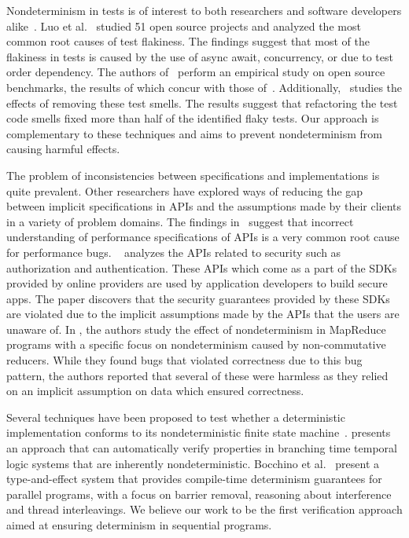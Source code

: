 Nondeterminism in tests is of interest to both
researchers and software developers alike~\cite{Fowler,Sudarshan}.
Luo et al.~\cite{LuoHEM2014} studied 51 open source projects and analyzed the most common root causes of
test flakiness. The findings suggest that most of the flakiness in tests is caused by
the use of async await, concurrency, or due to test order dependency. The authors of~\cite{PlotkinA1993}
perform an empirical study on open source benchmarks, the results of which concur with those of~\cite{LuoHEM2014}.
Additionally,~\cite{PlotkinA1993} studies the effects of removing these test smells. The results suggest that
refactoring the test code smells fixed more than half of the identified flaky tests. Our approach is complementary to
these techniques and aims to prevent nondeterminism from causing harmful effects. 


The problem of inconsistencies between specifications and implementations
is quite prevalent. Other researchers have explored ways of reducing the gap between implicit
specifications in APIs and the assumptions made by their clients in a variety of problem domains.
The findings in~\cite{Jin:2012:UDR:2254064.2254075} suggest that incorrect understanding of performance specifications of 
APIs is a very common root cause for
performance bugs. ~\cite{Rui:2013:180377} analyzes the APIs related to security such as authorization and authentication.
These APIs which come as a part of the SDKs provided by online providers are used by application developers to 
build secure apps. The paper discovers that the security guarantees provided by these SDKs are violated due to
the implicit assumptions made by the APIs that the users are unaware of. In \cite{Xiao:2014:NMC:2591062.2591177},
the authors
study the effect of nondeterminism in MapReduce programs with a specific focus on nondeterminism caused by
non-commutative reducers. While they found bugs that violated correctness due to this bug pattern,
the authors reported that several of these were harmless as they relied on an implicit assumption on data
which ensured correctness. 

Several techniques have been proposed to test whether a
deterministic implementation conforms to its nondeterministic finite state machine~\cite{Petrenko1996,Petrenko:1993:NSM:648128.761244,Savor:1997:639710,Hierons:2004:TCD:1040993.1040998}.
\cite{Cook:2013:RNP:2491956.2491969} presents an approach that can automatically verify properties
in branching time temporal logic systems that are inherently
nondeterministic.
Bocchino et
al.~\cite{Bocchino:2009:TES:1640089.1640097,Bocchino:2011:SND:1926385.1926447}
present a type-and-effect system that provides compile-time determinism
guarantees for parallel programs, with a focus on barrier removal,
reasoning about interference and thread interleavings.
We believe our work to be the first verification approach
aimed at ensuring determinism in sequential programs.

